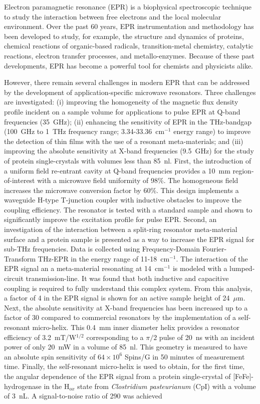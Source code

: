\vspace{-2em}
Electron paramagnetic resonance (EPR) is a biophysical spectroscopic technique to study the interaction between free electrons and the local molecular environment. Over the past 60 years, EPR instrumentation and methodology has been developed to study, for example, the structure and dynamics of proteins, chemical reactions of organic-based radicals, transition-metal chemistry, catalytic reactions, electron transfer processes, and metallo-enzymes. Because of these past developments, EPR has become a powerful tool for chemists and physicists alike. 

However, there remain several challenges in modern EPR that can be addressed by the development of application-specific microwave resonators. Three challenges are investigated: (i) improving the homogeneity of the magnetic flux density profile incident on a sample volume for applications to pulse EPR at Q-band frequencies (35~GHz); (ii) enhancing the sensitivity of EPR in the THz-bandgap (100~GHz to 1~THz frequency range; 3.34-33.36~cm$^{-1}$ energy range) to improve the detection of thin films with the use of a resonant meta-materials; and (iii) improving the absolute sensitivity at X-band frequencies (9.5~GHz) for the study of protein single-crystals with volumes less than 85~nl. First, the introduction of a uniform field re-entrant \cylTE{} cavity at Q-band frequencies provides a 10~mm region-of-interest with a microwave field uniformity of 98\%. The homogeneous field increases the microwave conversion factor by 60\%. This design implements a waveguide H-type T-junction coupler with inductive obstacles to improve the coupling efficiency. The resonator is tested with a standard sample and shown to significantly improve the excitation profile for pulse EPR. Second, an investigation of the interaction between a split-ring resonator meta-material surface and a protein sample is presented as a way to increase the EPR signal for sub-THz frequencies. Data is collected using Frequency-Domain Fourier-Transform THz-EPR in the energy range of 11-18~cm$^{-1}$. The interaction of the EPR signal an a meta-material resonating at 14~cm$^{-1}$ is modeled with a lumped-circuit transmission-line. It was found that both inductive and capacitive coupling is required to fully understand this complex system. From this analysis, a factor of 4 in the EPR signal is shown for an active sample height of 24~$\mu$m. Next, the absolute sensitivity at X-band frequencies has been increased up to a factor of 30 compared to commercial resonators by the implementation of a self-resonant micro-helix. This 0.4~mm inner diameter helix provides a resonator efficiency of 3.2~mT/W$^{1/2}$ corresponding to a $\pi/2$ pulse of 20~ns with an incident power of only 20~mW in a volume of 85~nl. This geometry is measured to have an absolute spin sensitivity of $64 \times 10^6$ Spins/G in 50 minutes of measurement time. Finally, the self-resonant micro-helix is used to obtain, for the first time, the angular dependence of the EPR signal from a protein single-crystal of [FeFe]-hydrogenase in the H$_{ox}$ state from {\em Clostridium pasteurianum} (CpI) with a volume of 3~nL. A signal-to-noise ratio of 290 was achieved 